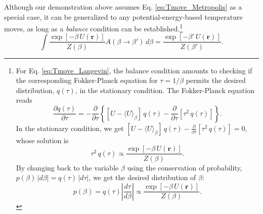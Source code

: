 \documentclass[11pt]{article}
\begin{document}
Although our demonstration above
assumes Eq. \eqref{eq:Tmove_Metropolis} as a special case,
it can be generalized to any potential-energy-based
temperature moves,
as long as a \emph{balance} condition
can be established.\footnote{
  For Eq. \eqref{eq:Tmove_Langevin},
  the balance condition amounts to checking if
  the corresponding Fokker-Planck equation
  for $\tau = 1/\beta$
  permits the desired distribution, $q(\tau)$,
  in the stationary condition.
  The Fokker-Planck equation reads
  $$
    \frac{ \partial q(\tau) } { \partial \tau }
    =
    -\frac{ \partial } { \partial \tau }
    \left\{
      [U - \langle U \rangle_\beta] \, q(\tau)
      -
      \frac{ \partial } { \partial \tau }
      \left[ \tau^2 \, q(\tau) \right]
    \right\}
    .
  $$
  In the stationary condition, we get
  $ [U - \langle U \rangle_\beta] \, q(\tau)
      -
      \frac{ \partial } { \partial \tau }
      \left[ \tau^2 \, q(\tau) \right] = 0$,
  whose solution is
  $$
    \tau^2 \, q(\tau) \propto
    \frac{ \exp[-\beta \, U(\mathbf r)] } { Z(\beta) }.
  $$
  By changing back to the variable $\beta$
  using the conservation of probability,
  $ p(\beta) \, |d\beta| = q(\tau) \, |d\tau|$,
  we get the desired distribution of $\beta$:
  $$
    p(\beta)
    =
    q(\tau) \left| \frac{ d\tau } { d\beta } \right|
    \propto
    \frac{ \exp[-\beta \, U(\mathbf r)] } { Z(\beta) }
    .
  $$
}
%
\begin{equation}
  \int
    \frac{ \exp\left[ -\beta \, U(\mathbf r) \right] }
         { Z( \beta ) }
    A(\beta \to \beta') \, d\beta
  =
    \frac{ \exp\left[ -\beta' \, U(\mathbf r) \right] }
         { Z( \beta' ) }
  .
\label{eq:beta_balance}
\end{equation}
%
\end{document}
